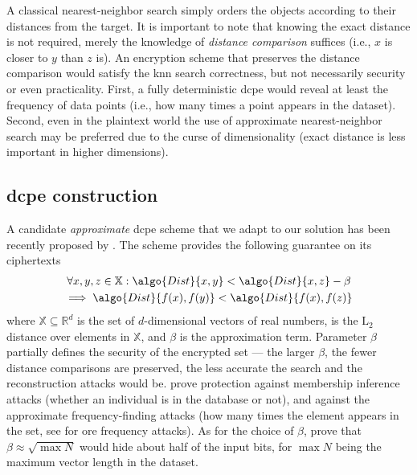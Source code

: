 		A classical nearest-neighbor search \cite{knn-wong,knn-cunningham} simply orders the objects according to their distances from the target.
		It is important to note that knowing the exact distance is not required, merely the knowledge of \emph{distance comparison} suffices (i.e., $x$ is closer to $y$ than $z$ is).
		An encryption scheme that preserves the distance comparison would satisfy the \acrshort{knn} search correctness, but not necessarily security or even practicality.
		First, a fully deterministic \acrfull{dcpe} would reveal at least the frequency of data points (i.e., how many times a point appears in the dataset).
		Second, even in the plaintext world the use of approximate nearest-neighbor search \cite{scalable-nn,approximate-nn-fixed-d} may be preferred due to the curse of dimensionality \cite{nn-meaningful,nn-curse-of-d} (exact distance is less important in higher dimensions).

		\subsection{\texorpdfstring{\acrshort{dcpe}}{DCPE} construction}

			A candidate \emph{approximate} \acrshort{dcpe} scheme that we adapt to our solution has been recently proposed by \textcite{dcpe}.
			The scheme provides the following guarantee on its ciphertexts
			\begin{multline*}
				\forall x, y, z \in \mathbb{X} : \algo{Dist}{x, y} < \algo{Dist}{x, z} - \beta \\
				\implies \algo{Dist}{f(x), f(y)} < \algo{Dist}{f(x), f(z)}
			\end{multline*}
			where $\mathbb{X} \subseteq \mathbb{R}^d$ is the set of $d$-dimensional vectors of real numbers,  is the $\text{L}_2$ distance over elements in $\mathbb{X}$, and $\beta$ is the approximation term.
			Parameter $\beta$ partially defines the security of the encrypted set --- the larger $\beta$, the fewer distance comparisons are preserved, the less accurate the search and the reconstruction attacks would be.
			\textcite{dcpe} prove protection against membership inference attacks \cite{memebership-inference-attacks-knn} (whether an individual is in the database or not), and against the approximate frequency-finding attacks (how many times the element appears in the set, see \cite{leakage-abuse-grubs-2017} for \acrshort{ore} frequency attacks).
			As for the choice of $\beta$, \textcite{dcpe} prove that $\beta \approx \sqrt{\max N}$ would hide about half of the input bits, for $\max N$ being the maximum vector length in the dataset.

